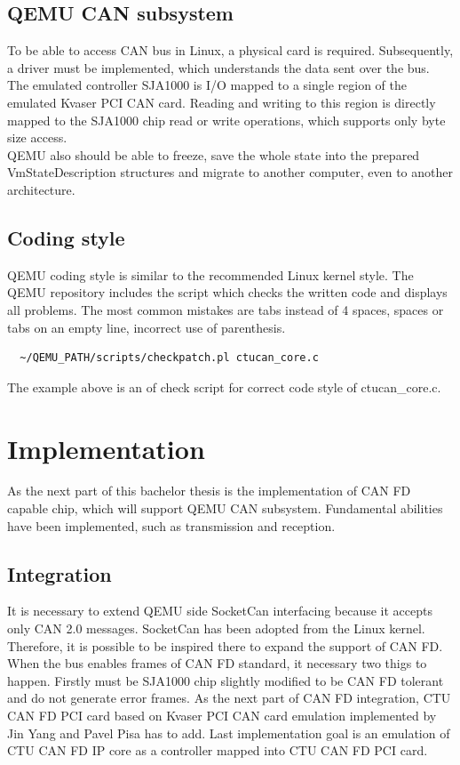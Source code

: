 \documentclass{ctuthesis}
\begin{document}
 \section{QEMU CAN subsystem}
  To be able to access CAN bus in Linux, a physical card is required. Subsequently, a driver must be implemented, which understands the data sent over the bus. \\
  The emulated controller SJA1000 is I/O mapped to a single region of the emulated Kvaser PCI CAN card. Reading and writing to this region is directly mapped to the SJA1000 chip read or write operations, which supports only byte size access. \\
  QEMU also should be able to freeze, save the whole state into the prepared VmStateDescription structures and migrate to another computer, even to another architecture. \\

 \section{Coding style}
  QEMU coding style \cite{qemu-style} is similar to the recommended Linux kernel style.  The QEMU repository includes the script which checks the written code and displays all problems. The most common mistakes are tabs instead of 4 spaces, spaces or tabs on an empty line, incorrect use of parenthesis.
  \begin{verbatim}  ~/QEMU_PATH/scripts/checkpatch.pl ctucan_core.c\end{verbatim}
  The example above is an of check script for correct code style of ctucan\_core.c.

 
\chapter{Implementation}
 As the next part of this bachelor thesis is the implementation of CAN FD capable chip, which will support QEMU CAN subsystem. Fundamental abilities have been implemented, such as transmission and reception. 
 \section{Integration}
  It is necessary to extend QEMU side SocketCan interfacing because it accepts only CAN 2.0 messages. SocketCan has been adopted from the Linux kernel. Therefore, it is possible to be inspired there to expand the support of CAN FD. When the bus enables frames of CAN FD standard, it necessary two thigs to happen. Firstly must be SJA1000 chip slightly modified to be CAN FD tolerant and do not generate error frames. As the next part of CAN FD integration, CTU CAN FD PCI card based on Kvaser PCI CAN card emulation implemented by Jin Yang and Pavel Pisa has to add. Last implementation goal is an emulation of CTU CAN FD IP core as a controller mapped into CTU CAN FD PCI card.
\end{document}
